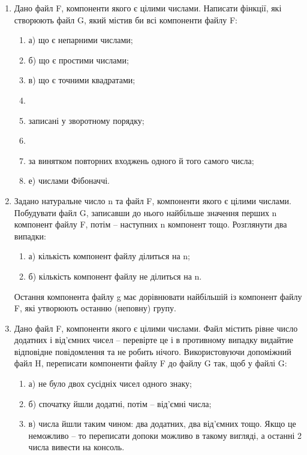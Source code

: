 \documentclass[]{article}
\makeatletter
\newcommand{\xslalph}[1]{\expandafter\@xslalph\csname c@#1\endcsname}
\newcommand{\@xslalph}[1]{%
    \ifcase#1\or а\or б\or в\or г\or д\or e\or є\or ж\or з\or i%
    \or й\or к\or л\or м\or н\or о\or п\or р\or с\or т%
    \or у\or ф\or х\or ц\or ч\or ш\or ю\or я\or аа\or бб\or вв%
    \else\@ctrerr\fi%
}
\makeatother
\begin{document}
\begin{enumerate}
\begin{enumerate}[label=\xslalph*)]
\begin{enumerate}
\begin{enumerate}[label=\xslalph*)]
\begin{enumerate}
\item
  Дано файл F, компоненти якого є цілими числами. Написати фінкції, які
  створюють файл G, який містив би всі компоненти файлу F:

\begin{enumerate}[label=\xslalph*)]
\item
а) що є непарними числами;
\item
б) що є простими числами;
\item
в) що є точними квадратами;
\item\item записані у зворотному порядку;
\item\item за винятком повторних входжень одного й того самого числа;
\item
е) числами Фібоначчі.
\end{enumerate}


\item
  Задано натуральне число n та файл F, компоненти якого є цілими
  числами. Побудувати файл G, записавши до нього найбільше значення
  перших n компонент файлу F, потім -- наступних n компонент тощо.
  Розглянути два випадки:
\begin{enumerate}[label=\xslalph*)]
\item
а) кількість компонент файлу ділиться на n;
\item
б) кількість компонент файлу не ділиться на n. 
\end{enumerate}
Остання компонента файлу
g має дорівнювати найбільшій із компонент файлу F, які утворюють останню
(неповну) групу.

\item
  Дано файл F, компоненти якого є цілими числами. Файл містить рівне
  число додатних і від'ємних чисел -- перевірте це і в противному
  випадку видайтие відповідне повідомлення та не робить нічого.
  Використовуючи допоміжний файл H, переписати компоненти файлу F до
  файлу G так, щоб у файлі G:
\begin{enumerate}[label=\xslalph*)]
\item
а) не було двох сусідніх чисел одного знаку;
\item
б) спочатку йшли додатні, потім -- від'ємні числа;
\item
в) числа йшли таким чином: два додатних, два від'ємних тощо. Якщо це
неможливо -- то переписати допоки можливо в такому вигляді, а останні 2
числа вивести на консоль.
\end{enumerate}


\end{enumerate}
\end{enumerate}
\end{enumerate}
\end{enumerate}
\end{enumerate}
\end{document}
